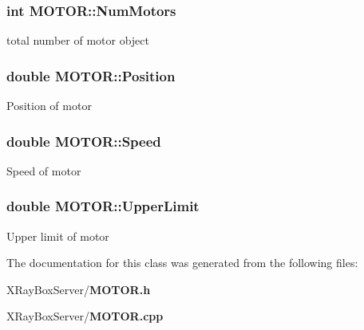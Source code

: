 \subsubsection{\setlength{\rightskip}{0pt plus 5cm}int \bf{MOTOR::Num\-Motors}\hspace{0.3cm}{\tt  [static]}}\label{classMOTOR_eb1cf5135e034e691b3cb17118e0c166}


total number of motor object 
\subsubsection{\setlength{\rightskip}{0pt plus 5cm}double \bf{MOTOR::Position}\hspace{0.3cm}{\tt  [private]}}\label{classMOTOR_b2d5ff4985c11dbb8109cbde10f12e3a}


Position of motor 
\subsubsection{\setlength{\rightskip}{0pt plus 5cm}double \bf{MOTOR::Speed}\hspace{0.3cm}{\tt  [private]}}\label{classMOTOR_e1559ac323b8aacd1a5ebb4c08845251}


Speed of motor 
\subsubsection{\setlength{\rightskip}{0pt plus 5cm}double \bf{MOTOR::Upper\-Limit}\hspace{0.3cm}{\tt  [private]}}\label{classMOTOR_96ecf8934d24136e239887dcc4f20e6d}


Upper limit of motor 

The documentation for this class was generated from the following files:\begin{CompactItemize}
\item 
XRay\-Box\-Server/\bf{MOTOR.h}\item 
XRay\-Box\-Server/\bf{MOTOR.cpp}\end{CompactItemize}
